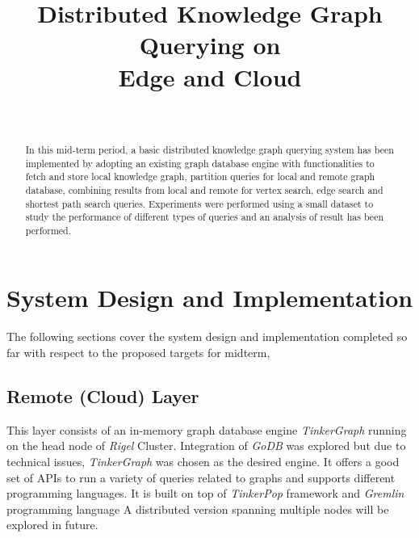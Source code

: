 \documentclass[conference]{IEEEtran}
\begin{document}
\title{Distributed Knowledge Graph Querying on \\ Edge and Cloud}


\author{\\
}


\maketitle


\begin{abstract}
In this mid-term period, a basic distributed knowledge graph querying system has been implemented by adopting an existing graph database engine with functionalities to fetch and store local knowledge graph, partition queries for local and remote graph database, combining results from local and remote for vertex search, edge search and shortest path search queries. Experiments were performed using a small dataset to study the performance of different types of queries and an analysis of result has been performed.  
\end{abstract}

\section{System Design and Implementation}

The following sections cover the system design and implementation completed so far with respect to the proposed targets for midterm,

\subsection{Remote (Cloud) Layer}
This layer consists of an in-memory graph database engine \emph{TinkerGraph}\cite{tinkergraph} running on the head node of \emph{Rigel} Cluster. Integration of \emph{GoDB} \cite{jamadagni:ccgrid:2016} was explored but due to technical issues, \emph{TinkerGraph} was chosen as the desired engine. It offers a good set of APIs to run a variety of queries related to graphs and supports different programming languages. It is built on top of \emph{TinkerPop} framework and \emph{Gremlin}\cite{Rodriguez:2015:GGT:2815072.2815073} programming language A distributed version spanning multiple nodes will be explored in future.
\end{document}
